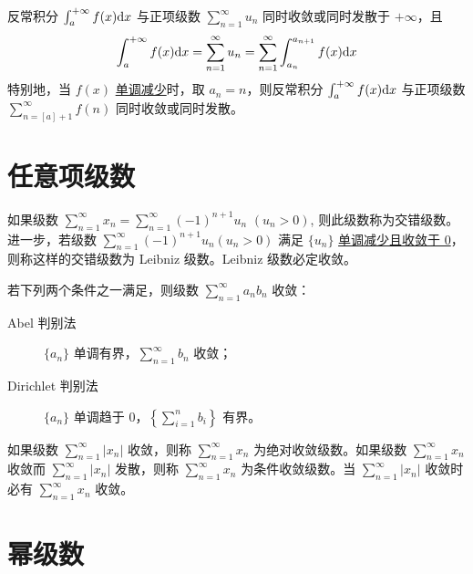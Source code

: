 \documentclass{ctexbook}
\def\diff{\textnormal{d}}
\begin{document}
\begin{theorem}[积分判别法]
    反常积分 $\int_{a}^{+\infty}f(x)\diff x$ 与正项级数 $\sum_{n=1}^\infty u_n$ 同时收敛或同时发散于 $+\infty$，且
    \begin{equation}
        \int_a^{+\infty}f(x)\diff x=\sum_{n=1}^\infty u_n=\sum_{n=1}^\infty\int_{a_n}^{a_{n+1}}f(x)\diff x
    \end{equation}
    特别地，当 $f(x)$ \underline{单调减少}时，取 $a_n=n$，则反常积分 $\int_a^{+\infty}f(x)\diff x$ 与正项级数 $\sum_{n=[a]+1}^\infty f(n)$ 同时收敛或同时发散。
\end{theorem}

\section{任意项级数}

\begin{theorem}
    如果级数 $\sum_{n=1}^\infty x_n=\sum_{n=1}^\infty(-1)^{n+1}u_n$ $(u_n>0)$, 则此级数称为交错级数。进一步，若级数 $\sum_{n=1}^\infty (-1)^{n+1}u_n(u_n>0)$ 满足 $\{u_n\}$ \underline{单调减少且收敛于 0}，则称这样的交错级数为 Leibniz 级数。Leibniz 级数必定收敛。 
\end{theorem}

\begin{theorem}
    若下列两个条件之一满足，则级数 $\sum_{n=1}^\infty a_nb_n$ 收敛：
    \begin{description}
        \item[Abel 判别法] $\{a_n\}$ 单调有界，$\sum_{n=1}^\infty b_n$ 收敛；
        \item[Dirichlet 判别法] $\{a_n\}$ 单调趋于 0，$\left\{\sum_{i=1}^n b_i\right\}$ 有界。
    \end{description}
\end{theorem}

\begin{definition}[绝对收敛与条件收敛]
    如果级数 $\sum_{n=1}^\infty |x_n|$ 收敛，则称 $\sum_{n=1}^\infty x_n$ 为绝对收敛级数。如果级数 $\sum_{n=1}^\infty x_n$ 收敛而 $\sum_{n=1}^\infty |x_n|$ 发散，则称 $\sum_{n=1}^\infty x_n$ 为条件收敛级数。当 $\sum_{n=1}^\infty |x_n|$ 收敛时必有 $\sum_{n=1}^\infty x_n$ 收敛。
\end{definition}

\section{幂级数}
\end{document}
